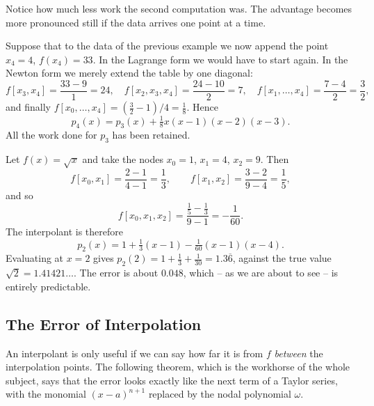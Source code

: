 \documentclass[a4paper]{scrartcl}
\begin{document}
Notice how much less work the second computation was. The advantage becomes more pronounced still if the data arrives one point at a time.

\begin{example}
  Suppose that to the data of the previous example we now append the point $x_4 = 4$, $f(x_4) = 33$. In the Lagrange form we would have to start again. In the Newton form we merely extend the table by one diagonal:
  $$
  f[x_3, x_4] = \frac{33 - 9}{1} = 24, \quad f[x_2, x_3, x_4] = \frac{24 - 10}{2} = 7, \quad f[x_1, \dots, x_4] = \frac{7 - 4}{2} = \frac{3}{2},
  $$
  and finally $f[x_0, \dots, x_4] = (\tfrac{3}{2} - 1)/4 = \tfrac{1}{8}$. Hence
  $$
  p_4(x) = p_3(x) + \tfrac{1}{8}x(x-1)(x-2)(x-3).
  $$
  All the work done for $p_3$ has been retained.
\end{example}

\begin{example}
  Let $f(x) = \sqrt{x}$ and take the nodes $x_0 = 1$, $x_1 = 4$, $x_2 = 9$. Then
  $$
  f[x_0, x_1] = \frac{2 - 1}{4 - 1} = \frac{1}{3}, \qquad f[x_1, x_2] = \frac{3 - 2}{9 - 4} = \frac{1}{5},
  $$
  and so
  $$
  f[x_0, x_1, x_2] = \frac{\frac{1}{5} - \frac{1}{3}}{9 - 1} = -\frac{1}{60}.
  $$
  The interpolant is therefore
  $$
  p_2(x) = 1 + \tfrac{1}{3}(x-1) - \tfrac{1}{60}(x-1)(x-4).
  $$
  Evaluating at $x = 2$ gives $p_2(2) = 1 + \tfrac{1}{3} + \tfrac{1}{30} = 1.3\overline{6}$, against the true value $\sqrt{2} = 1.41421\ldots$. The error is about $0.048$, which -- as we are about to see -- is entirely predictable.
\end{example}

\subsection{The Error of Interpolation}

An interpolant is only useful if we can say how far it is from $f$ \emph{between} the interpolation points. The following theorem, which is the workhorse of the whole subject, says that the error looks exactly like the next term of a Taylor series, with the monomial $(x - a)^{n+1}$ replaced by the nodal polynomial $\omega$.
\end{document}
